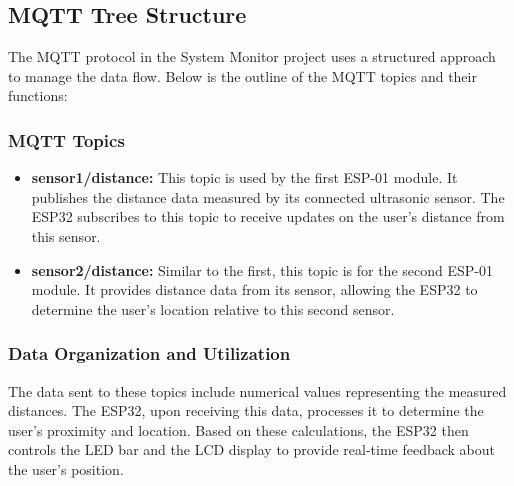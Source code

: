 \documentclass{article}
\begin{document}
\subsection{MQTT Tree Structure}
The MQTT protocol in the System Monitor project uses a structured approach to manage the data flow. Below is the outline of the MQTT topics and their functions:

\subsubsection{MQTT Topics}
\begin{itemize}
    \item \textbf{sensor1/distance:} This topic is used by the first ESP-01 module. It publishes the distance data measured by its connected ultrasonic sensor. The ESP32 subscribes to this topic to receive updates on the user's distance from this sensor.
    \item \textbf{sensor2/distance:} Similar to the first, this topic is for the second ESP-01 module. It provides distance data from its sensor, allowing the ESP32 to determine the user's location relative to this second sensor.
\end{itemize}

\subsubsection{Data Organization and Utilization}
The data sent to these topics include numerical values representing the measured distances. The ESP32, upon receiving this data, processes it to determine the user's proximity and location. Based on these calculations, the ESP32 then controls the LED bar and the LCD display to provide real-time feedback about the user's position.
\end{document}
